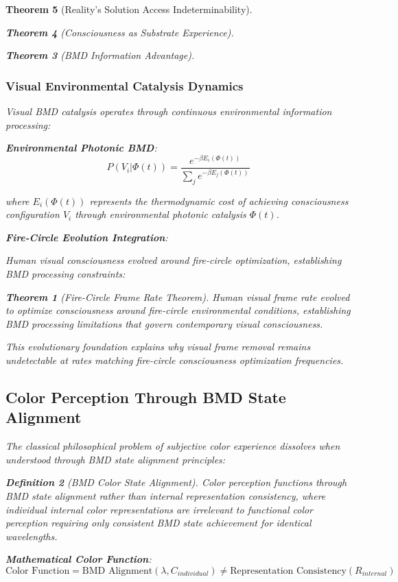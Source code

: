 \documentclass[12pt,a4paper]{article}
\newtheorem{theorem}{Theorem}[section]
\newtheorem{definition}[theorem]{Definition}
\theoremstyle{remark}
\begin{document}
\begin{theorem}[Reality's Solution Access Indeterminability]
\begin{theorem}[Consciousness as Substrate Experience]
\begin{theorem}[BMD Information Advantage]
\subsubsection{Visual Environmental Catalysis Dynamics}

Visual BMD catalysis operates through continuous environmental information processing:

\textbf{Environmental Photonic BMD}:
$$P(V_i | \Phi(t)) = \frac{e^{-\beta E_i(\Phi(t))}}{\sum_j e^{-\beta E_j(\Phi(t))}}$$

where $E_i(\Phi(t))$ represents the thermodynamic cost of achieving consciousness configuration $V_i$ through environmental photonic catalysis $\Phi(t)$.

\textbf{Fire-Circle Evolution Integration}:

Human visual consciousness evolved around fire-circle optimization, establishing BMD processing constraints:

\begin{theorem}[Fire-Circle Frame Rate Theorem]
Human visual frame rate evolved to optimize consciousness around fire-circle environmental conditions, establishing BMD processing limitations that govern contemporary visual consciousness.
\end{theorem}

This evolutionary foundation explains why visual frame removal remains undetectable at rates matching fire-circle consciousness optimization frequencies.

\subsection{Color Perception Through BMD State Alignment}

The classical philosophical problem of subjective color experience dissolves when understood through BMD state alignment principles:

\begin{definition}[BMD Color State Alignment]
Color perception functions through BMD state alignment rather than internal representation consistency, where individual internal color representations are irrelevant to functional color perception requiring only consistent BMD state achievement for identical wavelengths.
\end{definition}

\textbf{Mathematical Color Function}:
$$\text{Color Function} = \text{BMD Alignment}(\lambda, C_{individual}) \neq \text{Representation Consistency}(R_{internal})$$


\end{theorem}
\end{theorem}
\end{theorem}
\end{document}

